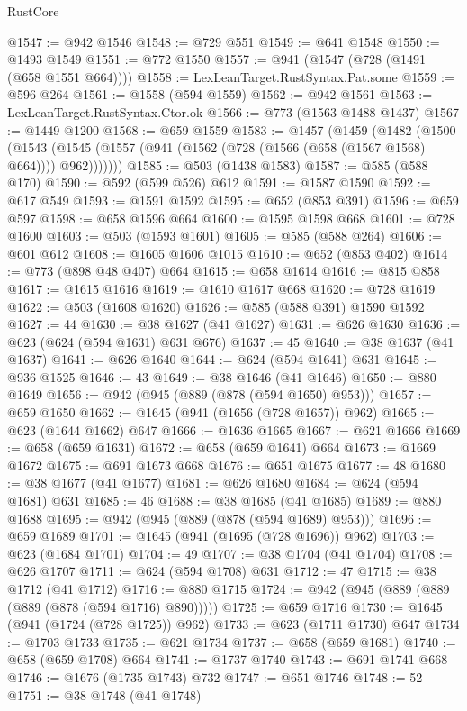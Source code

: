 \begin{lexlean}{RustCore}
\begin{coremodule}
@1547 := @942 @1546
@1548 := @729 @551
@1549 := @641 @1548
@1550 := @1493 @1549
@1551 := @772 @1550
@1557 := @941 (@1547 (@728 (@1491 (@658 @1551 @664))))
@1558 := LexLeanTarget.RustSyntax.Pat.some
@1559 := @596 @264
@1561 := @1558 (@594 @1559)
@1562 := @942 @1561
@1563 := LexLeanTarget.RustSyntax.Ctor.ok
@1566 := @773 (@1563 @1488 @1437)
@1567 := @1449 @1200
@1568 := @659 @1559
@1583 := @1457
    (@1459
      (@1482
        (@1500
          (@1543 (@1545 (@1557 (@941 (@1562 (@728 (@1566 (@658 (@1567 @1568) @664)))) @962)))))))
@1585 := @503 (@1438 @1583)
@1587 := @585 (@588 @170)
@1590 := @592 (@599 @526) @612
@1591 := @1587 @1590
@1592 := @617 @549
@1593 := @1591 @1592
@1595 := @652 (@853 @391)
@1596 := @659 @597
@1598 := @658 @1596 @664
@1600 := @1595 @1598 @668
@1601 := @728 @1600
@1603 := @503 (@1593 @1601)
@1605 := @585 (@588 @264)
@1606 := @601 @612
@1608 := @1605 @1606 @1015
@1610 := @652 (@853 @402)
@1614 := @773 (@898 @48 @407) @664
@1615 := @658 @1614
@1616 := @815 @858
@1617 := @1615 @1616
@1619 := @1610 @1617 @668
@1620 := @728 @1619
@1622 := @503 (@1608 @1620)
@1626 := @585 (@588 @391) @1590 @1592
@1627 := 44
@1630 := @38 @1627 (@41 @1627)
@1631 := @626 @1630
@1636 := @623 (@624 (@594 @1631) @631 @676)
@1637 := 45
@1640 := @38 @1637 (@41 @1637)
@1641 := @626 @1640
@1644 := @624 (@594 @1641) @631
@1645 := @936 @1525
@1646 := 43
@1649 := @38 @1646 (@41 @1646)
@1650 := @880 @1649
@1656 := @942 (@945 (@889 (@878 (@594 @1650) @953)))
@1657 := @659 @1650
@1662 := @1645 (@941 (@1656 (@728 @1657)) @962)
@1665 := @623 (@1644 @1662) @647
@1666 := @1636 @1665
@1667 := @621 @1666
@1669 := @658 (@659 @1631)
@1672 := @658 (@659 @1641) @664
@1673 := @1669 @1672
@1675 := @691 @1673 @668
@1676 := @651 @1675
@1677 := 48
@1680 := @38 @1677 (@41 @1677)
@1681 := @626 @1680
@1684 := @624 (@594 @1681) @631
@1685 := 46
@1688 := @38 @1685 (@41 @1685)
@1689 := @880 @1688
@1695 := @942 (@945 (@889 (@878 (@594 @1689) @953)))
@1696 := @659 @1689
@1701 := @1645 (@941 (@1695 (@728 @1696)) @962)
@1703 := @623 (@1684 @1701)
@1704 := 49
@1707 := @38 @1704 (@41 @1704)
@1708 := @626 @1707
@1711 := @624 (@594 @1708) @631
@1712 := 47
@1715 := @38 @1712 (@41 @1712)
@1716 := @880 @1715
@1724 := @942 (@945 (@889 (@889 (@889 (@878 (@594 @1716) @890)))))
@1725 := @659 @1716
@1730 := @1645 (@941 (@1724 (@728 @1725)) @962)
@1733 := @623 (@1711 @1730) @647
@1734 := @1703 @1733
@1735 := @621 @1734
@1737 := @658 (@659 @1681)
@1740 := @658 (@659 @1708) @664
@1741 := @1737 @1740
@1743 := @691 @1741 @668
@1746 := @1676 (@1735 @1743) @732
@1747 := @651 @1746
@1748 := 52
@1751 := @38 @1748 (@41 @1748)

\end{coremodule}
\end{lexlean}
